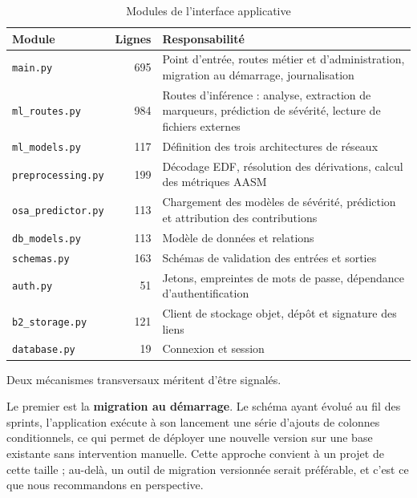 \begin{table}[H]
\centering
\caption{Modules de l'interface applicative}
\label{tab:modules}
\small
\begin{tabular}{@{}lrL{8.3cm}@{}}
\toprule
\textbf{Module} & \textbf{Lignes} & \textbf{Responsabilité} \\
\midrule
\texttt{main.py}          & 695 & Point d'entrée, routes métier et d'administration,
                                  migration au démarrage, journalisation \\
\texttt{ml\_routes.py}    & 984 & Routes d'inférence : analyse, extraction de
                                  marqueurs, prédiction de sévérité, lecture de
                                  fichiers externes \\
\texttt{ml\_models.py}    & 117 & Définition des trois architectures de réseaux \\
\texttt{preprocessing.py} & 199 & Décodage EDF, résolution des dérivations, calcul
                                  des métriques AASM \\
\texttt{osa\_predictor.py}& 113 & Chargement des modèles de sévérité, prédiction et
                                  attribution des contributions \\
\texttt{db\_models.py}    & 113 & Modèle de données et relations \\
\texttt{schemas.py}       & 163 & Schémas de validation des entrées et sorties \\
\texttt{auth.py}          &  51 & Jetons, empreintes de mots de passe, dépendance
                                  d'authentification \\
\texttt{b2\_storage.py}   & 121 & Client de stockage objet, dépôt et signature des
                                  liens \\
\texttt{database.py}      &  19 & Connexion et session \\
\bottomrule
\end{tabular}
\end{table}

Deux mécanismes transversaux méritent d'être signalés.

Le premier est la \textbf{migration au démarrage}. Le schéma ayant évolué au fil des
sprints, l'application exécute à son lancement une série d'ajouts de colonnes
conditionnels, ce qui permet de déployer une nouvelle version sur une base existante
sans intervention manuelle. Cette approche convient à un projet de cette taille ;
au-delà, un outil de migration versionnée serait préférable, et c'est ce que nous
recommandons en perspective.


